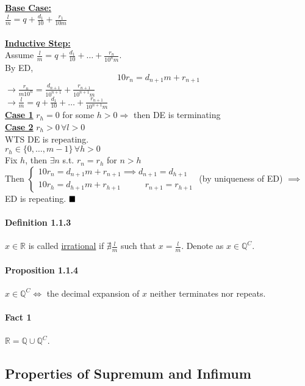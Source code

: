 \documentclass[11pt]{article}
\newcommand{\real}[0]{\mathbb{R}}
\newcommand{\under}[1]{\underline{#1}}
\newcommand{\rational}[0]{\mathbb{Q}}
\newcommand{\qed}[0]{$\hfill\blacksquare$}
\begin{document}
\textbf{\under{Base Case:}} \\
$\frac{l}{m} = q + \frac{d_1}{10} + \frac{r_1}{10m}$ \\\\
\textbf{\under{Inductive Step:}} \\
Assume $\frac{l}{m} = q + \frac{d_1}{10} + \hdots + \frac{r_n}{10^nm}$. \\
By ED, $$10r_n = d_{n+1} m + r_{n+1}$$
$\rightarrow \frac{r_n}{m10^n} = \frac{d_{n+1}}{10^{n+1}} + \frac{r_{n+1}}{10^{n+1}m}$ \\
$\rightarrow \frac{l}{m} = q + \frac{d_1}{10} + \hdots + \frac{r_{n+1}}{10^{n+1}m}$ \\
\textbf{\under{Case 1}} $r_h = 0$ for some $h > 0 \Rightarrow$ then DE is terminating \\
\textbf{\under{Case 2}} $r_h > 0 \, \forall l > 0$ \\
WTS DE is repeating. \\
$r_h \in \{0, \hdots, m-1\} \, \forall h > 0$ \\
Fix $h$, then $\exists n$ s.t. $r_n = r_h$ for $n > h$ \\
Then
$\begin{cases}
	10 r_n = d_{n+1}m + r_{n+1} \implies d_{n+1} = d_{h+1}\\
	10 r_h = d_{h+1}m + r_{h+1} \quad\quad\,\,\,\,\, r_{n+1} = r_{h+1}
\end{cases}$
(by uniqueness of ED)
$\implies$ ED is repeating. \qed
\paragraph{Definition 1.1.3} $x \in \real$ is called \under{irrational} if $\nexists \frac{l}{m}$ such that $x = \frac{l}{m}$. Denote as $x \in \rational^C$.
\paragraph{Proposition 1.1.4} $x \in \rational^C \iff$ the decimal expansion of $x$ neither terminates nor repeats.
\paragraph{Fact 1} $\real = \rational \cup \rational^C$.
\subsection{Properties of Supremum and Infimum}
\end{document}
